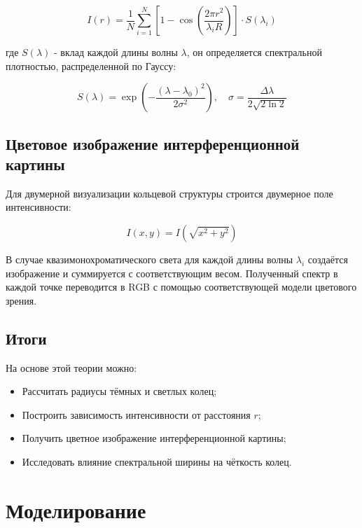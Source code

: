 \documentclass[a4paper,11pt]{article}
\theoremstyle{definition}
\begin{document}
    \begin{equation}
        I(r) = \frac{1}{N} \sum_{i=1}^{N} \left[1 - \cos\left( \frac{2\pi r^2}{\lambda_i R} \right) \right] \cdot S(\lambda_i)\label{eq:equation7}
    \end{equation}

    где \( S(\lambda) \) - вклад каждой длины волны \(\lambda\), он определяется спектральной плотностью,
    распределенной по Гауссу:

    \begin{equation}
        S(\lambda) = \exp\left( -\frac{(\lambda - \lambda_0)^2}{2\sigma^2} \right), \quad \sigma = \frac{\Delta\lambda}{2\sqrt{2 \ln 2}}\label{eq:equation8}
    \end{equation}

    \subsection{Цветовое изображение интерференционной картины}
    Для двумерной визуализации кольцевой структуры строится двумерное поле интенсивности:

    \begin{equation}
        I(x, y) = I\left( \sqrt{x^2 + y^2} \right)\label{eq:equation9}
    \end{equation}

    В случае квазимонохроматического света для каждой длины волны \( \lambda_i \) создаётся изображение
    и суммируется с соответствующим весом. Полученный спектр в каждой точке переводится в RGB с помощью
    соответствующей модели цветового зрения.

    \subsection{Итоги}
    На основе этой теории можно:
    \begin{itemize}
        \item Рассчитать радиусы тёмных и светлых колец;
        \item Построить зависимость интенсивности от расстояния \( r \);
        \item Получить цветное изображение интерференционной картины;
        \item Исследовать влияние спектральной ширины на чёткость колец.
    \end{itemize}


    \section{Моделирование}
\end{document}
